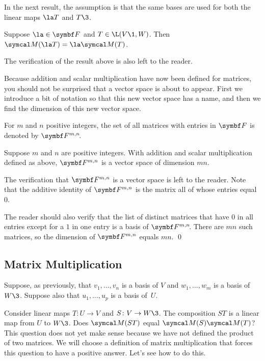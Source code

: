 In the next result, the assumption is that the same bases are used for both the linear maps $\la T$ and $T\3$.

{Suppose $\la \in \F{}$ and $T \in \L(V\1, W)$. Then $\M(\la T) = \la \M(T)$.}

The verification of the result above is also left to the reader.

Because addition and scalar multiplication have now been defined for matrices, you should not be surprised that a vector space is about to appear.  First we introduce a bit of notation so that this new vector space has a name, and then we find the dimension of this new vector space.

{For $m$ and $n$ positive integers, the set of all
 matrices with entries in $\F{}$ is denoted by
$\FF{m,n}$.}

{Suppose $m$ and $n$ are positive integers. With addition and scalar multiplication defined as above, $\F{m,n}$ is a vector space of dimension $mn$.}

\proof
The verification that $\F{m,n}$ is a vector space is left to the reader.
Note that the additive  identity of $\F{m,n}$ is the  matrix all of whose entries equal~$0$.

The reader should also verify that the list of distinct  matrices
that have $0$ in all entries except for a $1$ in one entry is a basis of $\FF{m,n}$.  There are $mn$ such
matrices, so the dimension of $\F{m,n}$ equals $mn$. \qed

\subsection{Matrix Multiplication}

Suppose, as previously, that $v_1, \dots, v_n$ is a basis of $V$ and $w_1, \dots, w_m$ is a basis of~$W\3$.  Suppose also that
$u_1, \dots, u_p$ is a basis of~$U$.

Consider linear maps $T\colon U  \rightarrow V$
and $S\colon V \rightarrow W\3$.  The composition $ST$ is a linear map from $U$
to $W\3$.  Does $\M(ST)$ equal $\M(S) \M(T)$? This question does not yet make sense because
we have not defined the product of two matrices. We will choose a definition of matrix multiplication that forces this question to have a positive answer.  Let's see how to do this.

